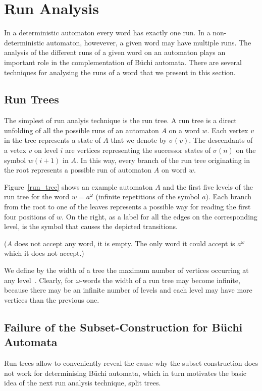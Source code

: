 \documentclass[a4paper]{report}
\newcommand{\om}{{$\omega$}}
\begin{document}
\section{Run Analysis}
In a deterministic automaton every word has exactly one run. In a non-deterministic automaton, howevever, a given word may have multiple runs. The analysis of the different runs of a given word on an automaton plays an important role in the complementation of Büchi automata. There are several techniques for analysing the runs of a word that we present in this section.

\subsection{Run Trees}
The simplest of run analyis technique is the run tree. A run tree is a direct unfolding of all the possible runs of an automaton $A$ on a word $w$. Each vertex $v$ in the tree represents a state of $A$ that we denote by $\sigma(v)$. The descendants of a vetex $v$ on level $i$ are vertices representing the successor states of $\sigma(n)$ on the symbol $w(i+1)$ in $A$. In this way, every branch of the run tree originating in the root represents a possible run of automaton $A$ on word $w$.

Figure~\ref{run_tree} shows an example automaton $A$ and the first five levels of the run tree for the word $w = a^\omega$ (infinite repetitions of the symbol $a$). Each branch from the root to one of the leaves represents a possible way for reading the first four positions of $w$. On the right, as a label for all the edges on the corresponding level, is the symbol that causes the depicted transitions.

($A$ does not accept any word, it is empty. The only word it could accept is $a^\omega$ which it does not accept.)

We define by the width of a tree the maximum number of vertices occurring at any level~\cite{Muller199569}. Clearly, for \om-words the width of a run tree may become infinite, because there may be an infinite number of levels and each level may have more vertices than the previous one. 

\subsection{Failure of the Subset-Construction for Büchi Automata}
Run trees allow to conveniently reveal the cause why the subset construction does not work for determinising Büchi automata, which in turn motivates the basic idea of the next run analysis technique, split trees.
\end{document}
